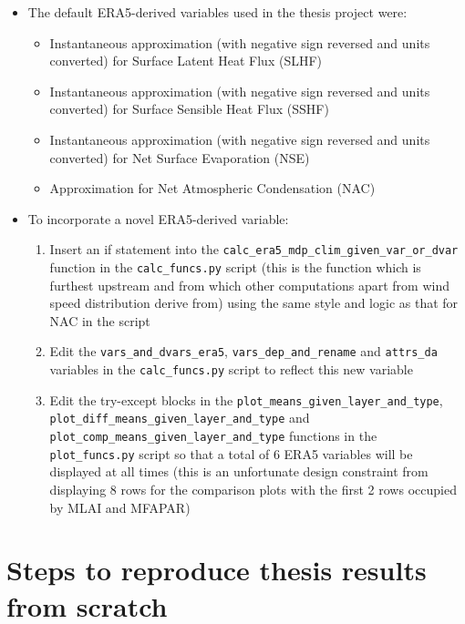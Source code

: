 \begin{itemize}
	\item The default ERA5-derived variables used in the thesis project were: 
	\begin{itemize}
		\item Instantaneous approximation (with negative sign reversed and units converted) for Surface Latent Heat Flux (SLHF)
		\item Instantaneous approximation (with negative sign reversed and units converted) for Surface Sensible Heat Flux (SSHF)
		\item Instantaneous approximation (with negative sign reversed and units converted) for Net Surface Evaporation (NSE)
		\item Approximation for Net Atmospheric Condensation (NAC)
	\end{itemize}
	\item To incorporate a novel ERA5-derived variable:
	\begin{enumerate}
		\item Insert an if statement into the \verb+calc_era5_mdp_clim_given_var_or_dvar+ function in the \verb+calc_funcs.py+ script (this is the function which is furthest upstream and from which other computations apart from wind speed distribution derive from) using the same style and logic as that for NAC in the script
		\item Edit the \verb+vars_and_dvars_era5+, \verb+vars_dep_and_rename+ and \verb+attrs_da+ variables in the \verb+calc_funcs.py+ script to reflect this new variable
		\item Edit the try-except blocks in the \verb+plot_means_given_layer_and_type+, \verb+plot_diff_means_given_layer_and_type+ and \\ \verb+plot_comp_means_given_layer_and_type+ functions in the \\ \verb+plot_funcs.py+ script so that a total of 6 ERA5 variables will be displayed at all times (this is an unfortunate design constraint from displaying 8 rows for the comparison plots with the first 2 rows occupied by MLAI and MFAPAR)
	\end{enumerate}
\end{itemize}

\section{Steps to reproduce thesis results from scratch}

